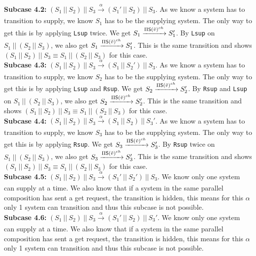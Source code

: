 \indent \textbf{Subcase 4.2: }$(S_1 \ || \ S_2)\ ||\ S_3 \xrightarrow[]{\alpha} (S_1' \ || \ S_2)\ ||\ S_3$. As we know a system has to transition to supply, we know $S_1$ has to be the supplying system. The only way to get this is by applying \texttt{Lsup} twice. We get $S_1\xrightarrow[]{\Pi \mathsf{S}(\Tilde{v})^{ch}} S_1'$. By \texttt{Lsup} on $S_1 \ ||\ (S_2 \ || \ S_3)$, we also get $S_1\xrightarrow[]{\Pi \mathsf{S}(\Tilde{v})^{ch}} S_1'$. This is the same transition and shows $(S_1 \ ||\ S_2 )\ || \ S_3 \equiv S_1 \ ||\ (S_2 \ || \ S_3)$ for this case.\\
\indent \textbf{Subcase 4.3: }$(S_1 \ || \ S_2)\ ||\ S_3 \xrightarrow[]{\alpha} (S_1 \ || \ S_2')\ ||\ S_3$. As we know a system has to transition to supply, we know $S_2$ has to be the supplying system. The only way to get this is by applying \texttt{Lsup} and \texttt{Rsup}. We get $S_2\xrightarrow[]{\Pi \mathsf{S}(\Tilde{v})^{ch}} S_2'$. By \texttt{Rsup} and \texttt{Lsup} on $S_1 \ ||\ (S_2 \ || \ S_3)$, we also get $S_2\xrightarrow[]{\Pi \mathsf{S}(\Tilde{v})^{ch}} S_2'$. This is the same transition and shows $(S_1 \ ||\ S_2 )\ || \ S_3 \equiv S_1 \ ||\ (S_2 \ || \ S_3)$ for this case.\\
\indent \textbf{Subcase 4.4: }$(S_1 \ || \ S_2)\ ||\ S_3 \xrightarrow[]{\alpha} (S_1 \ || \ S_2)\ ||\ S_3'$. As we know a system has to transition to supply, we know $S_3$ has to be the supplying system. The only way to get this is by applying \texttt{Rsup}. We get $S_3\xrightarrow[]{\Pi \mathsf{S}(\Tilde{v})^{ch}} S_3'$. By \texttt{Rsup} twice on $S_1 \ ||\ (S_2 \ || \ S_3)$, we also get $S_3\xrightarrow[]{\Pi \mathsf{S}(\Tilde{v})^{ch}} S_3'$. This is the same transition and shows $(S_1 \ ||\ S_2 )\ || \ S_3 \equiv S_1 \ ||\ (S_2 \ || \ S_3)$ for this case.\\
\indent \textbf{Subcase 4.5: }$(S_1 \ || \ S_2)\ ||\ S_3 \xrightarrow[]{\alpha} (S_1' \ || \ S_2')\ ||\ S_3$. We know only one system can supply at a time. We also know that if a system in the same parallel composition has sent a get request, the transition is hidden, this means for this $\alpha$ only 1 system can transition and thus this subcase is not possible.\\
\indent \textbf{Subcase 4.6: }$(S_1 \ || \ S_2)\ ||\ S_3 \xrightarrow[]{\alpha} (S_1' \ || \ S_2)\ ||\ S_3'$. We know only one system can supply at a time. We also know that if a system in the same parallel composition has sent a get request, the transition is hidden, this means for this $\alpha$ only 1 system can transition and thus this subcase is not possible.\\

